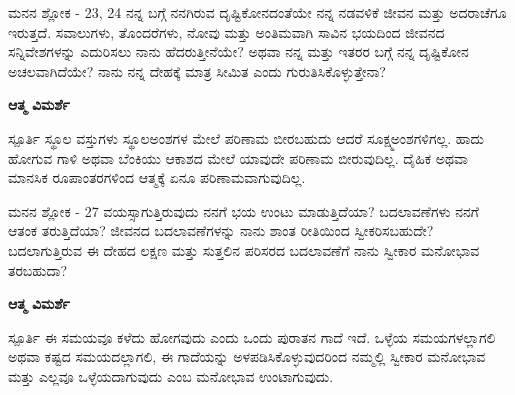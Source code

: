 \newpage
\begin{mananam}{\kanfont ಮನನ ಶ್ಲೋಕ - \textenglish{23, 24}}
\footnotesize \mananamfont ನನ್ನ ಬಗ್ಗೆ ನನಗಿರುವ ದೃಷ್ಟಿಕೋನದಂತೆಯೇ ನನ್ನ ನಡವಳಿಕೆ ಜೀವನ ಮತ್ತು ಅದರಾಚೆಗೂ ಇರುತ್ತದೆ. ಸವಾಲುಗಳು, ತೊಂದರೆಗಳು, ನೋವು ಮತ್ತು ಅಂತಿಮವಾಗಿ ಸಾವಿನ ಭಯದಿಂದ ಜೀವನದ ಸನ್ನಿವೇಶಗಳನ್ನು ಎದುರಿಸಲು ನಾನು ಹೆದರುತ್ತೀನೆಯೇ? ಅಥವಾ ನನ್ನ ಮತ್ತು ಇತರರ ಬಗ್ಗೆ ನನ್ನ ದೃಷ್ಟಿಕೋನ ಅಚಲವಾಗಿದೆಯೇ? ನಾನು ನನ್ನ ದೇಹಕ್ಕೆ ಮಾತ್ರ ಸೀಮಿತ ಎಂದು ಗುರುತಿಸಿಕೊಳ್ಳುತ್ತೇನಾ?
\end{mananam}
\WritingHand\enspace\textbf{ಆತ್ಮ ವಿಮರ್ಶೆ}
\begin{inspiration}{\kanfont ಸ್ಪೂರ್ತಿ}
\footnotesize \mananamfont ಸ್ಥೂಲ ವಸ್ತುಗಳು ಸ್ಥೂಲಅಂಶಗಳ ಮೇಲೆ ಪರಿಣಾಮ ಬೀರಬಹುದು ಆದರೆ ಸೂಕ್ಷ್ಮಅಂಶಗಳಿಗಲ್ಲ. ಹಾದು ಹೋಗುವ ಗಾಳಿ ಅಥವಾ ಬೆಂಕಿಯು ಆಕಾಶದ ಮೇಲೆ ಯಾವುದೇ ಪರಿಣಾಮ ಬೀರುವುದಿಲ್ಲ. ದೈಹಿಕ ಅಥವಾ ಮಾನಸಿಕ ರೂಪಾಂತರಗಳಿಂದ ಆತ್ಮಕ್ಕೆ ಏನೂ ಪರಿಣಾಮವಾಗುವುದಿಲ್ಲ.
\end{inspiration}
\newpage

\begin{mananam}{\kanfont ಮನನ ಶ್ಲೋಕ - \textenglish{27}}
\footnotesize \mananamfont ವಯಸ್ಸಾಗುತ್ತಿರುವುದು ನನಗೆ ಭಯ ಉಂಟು ಮಾಡುತ್ತಿದೆಯಾ? ಬದಲಾವಣೆಗಳು ನನಗೆ ಆತಂಕ ತರುತ್ತಿದೆಯಾ? ಜೀವನದ ಬದಲಾವಣೆಗಳನ್ನು ನಾನು ಶಾಂತ ರೀತಿಯಿಂದ ಸ್ವೀಕರಿಸಬಹುದೇ? ಬದಲಾಗುತ್ತಿರುವ ಈ ದೇಹದ ಲಕ್ಷಣ ಮತ್ತು ಸುತ್ತಲಿನ ಪರಿಸರದ ಬದಲಾವಣೆಗೆ ನಾನು ಸ್ವೀಕಾರ ಮನೋಭಾವ ತರಬಹುದಾ? 
\end{mananam}
\WritingHand\enspace\textbf{ಆತ್ಮ ವಿಮರ್ಶೆ}
\begin{inspiration}{\kanfont ಸ್ಪೂರ್ತಿ}
\footnotesize \mananamfont ಈ ಸಮಯವೂ ಕಳೆದು ಹೋಗವುದು ಎಂದು ಒಂದು ಪುರಾತನ ಗಾದೆ ಇದೆ. ಒಳ್ಳೆಯ ಸಮಯಗಳಲ್ಲಾಗಲಿ ಅಥವಾ ಕಷ್ಟದ ಸಮಯದಲ್ಲಾಗಲಿ, ಈ ಗಾದೆಯನ್ನು ಅಳಪಡಿಸಿಕೊಳ್ಳುವುದರಿಂದ ನಮ್ಮಲ್ಲಿ ಸ್ವೀಕಾರ ಮನೋಭಾವ ಮತ್ತು ಎಲ್ಲವೂ ಒಳ್ಳೆಯದಾಗುವುದು ಎಂಬ ಮನೋಭಾವ ಉಂಟಾಗುವುದು.
\end{inspiration}
\newpage

